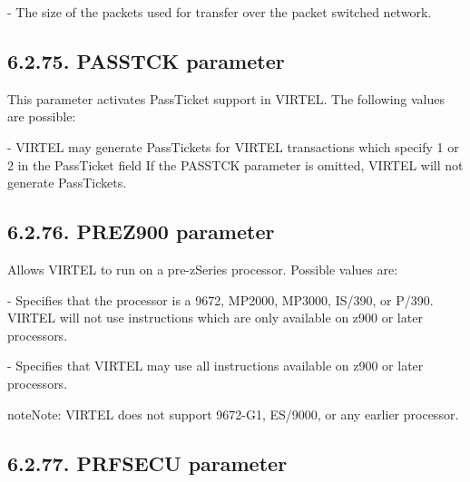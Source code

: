 \documentclass[letterpaper,10pt,english]{sphinxmanual}
\begin{document}
 - The size of the packets used for transfer over the packet switched network.


\subsection{6.2.75. PASSTCK parameter}
\label{\detokenize{Installation_Guide:passtck-parameter}}\label{\detokenize{Installation_Guide:virt457ig-passtck}}
\begin{sphinxVerbatim}[commandchars=\\\{\}]
 
\end{sphinxVerbatim}

This parameter activates PassTicket support in VIRTEL. The following values are possible:

 - VIRTEL may generate PassTickets for VIRTEL transactions which specify 1 or 2 in the PassTicket field If the PASSTCK parameter is omitted, VIRTEL will not generate PassTickets.


\subsection{6.2.76. PREZ900 parameter}
\label{\detokenize{Installation_Guide:prez900-parameter}}
\begin{sphinxVerbatim}[commandchars=\\\{\}]
 
\end{sphinxVerbatim}

Allows VIRTEL to run on a pre-zSeries processor. Possible values are:

 - Specifies that the processor is a 9672, MP2000, MP3000, IS/390, or P/390. VIRTEL will not use instructions which are only available on z900 or later processors.

 - Specifies that VIRTEL may use all instructions available on z900 or later processors.

\begin{sphinxadmonition}{note}{Note:}
VIRTEL does not support 9672-G1, ES/9000, or any earlier processor.
\end{sphinxadmonition}


\subsection{6.2.77. PRFSECU parameter}
\label{\detokenize{Installation_Guide:prfsecu-parameter}}
\begin{sphinxVerbatim}[commandchars=\\\{\}]
 
\end{sphinxVerbatim}
\end{document}
